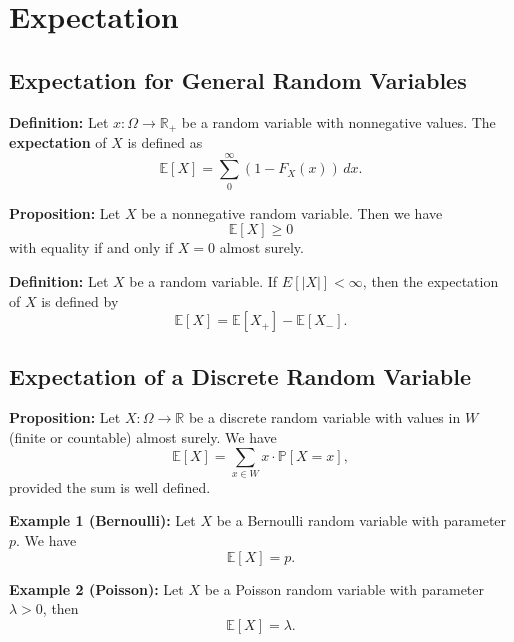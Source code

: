 \documentclass[a4paper]{extarticle}
\begin{document}
\section{Expectation}

\subsection{Expectation for General Random Variables}

\textbf{Definition:} Let \(x : \Omega \to \mathbb{R}_+\) be a random variable with nonnegative values. The \textbf{expectation} of \(X\) is defined as
\[
    \mathbb{E}[X] = \sum_0^{\infty} (1 - F_X(x)) \, dx.
\]

\textbf{Proposition:} Let \(X\) be a nonnegative random variable. Then we have
\[
    \mathbb{E}[X] \geq 0
\]
with equality if and only if \(X = 0\) almost surely.

\textbf{Definition:} Let \(X\) be a random variable. If \(E[|X|] < \infty\), then the expectation of \(X\) is defined by
\[
    \mathbb{E}[X] = \mathbb{E}[X_+] - \mathbb{E}[X_-].
\]

\subsection{Expectation of a Discrete Random Variable}

\begin{cbox}
    \textbf{Proposition:} Let \(X : \Omega \to \mathbb{R}\) be a discrete random variable with values in \(W\) (finite or countable) almost surely. We have
    \[
        \mathbb{E}[X] = \sum_{x \in W} x \cdot \mathbb{P}[X = x],
    \]
    provided the sum is well defined.
\end{cbox}

\begin{ebox}
    \textbf{Example 1 (Bernoulli):} Let \(X\) be a Bernoulli random variable with parameter \(p\). We have
    \[
        \mathbb{E}[X] = p.
    \]

    \textbf{Example 2 (Poisson):} Let \(X\) be a Poisson random variable with parameter \(\lambda > 0\), then
    \[
        \mathbb{E}[X] = \lambda.
    \]
\end{ebox}
\end{document}

